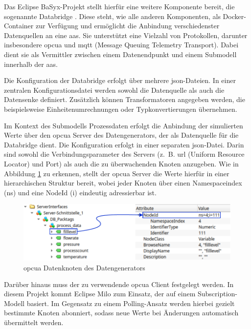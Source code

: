 Das Eclipse BaSyx-Projekt stellt hierfür eine weitere Komponente bereit, die sogenannte Databridge \cite{BaSyxDatabridge}.
Diese steht, wie alle anderen Komponenten, als Docker-Container zur Verfügung und ermöglicht die Anbindung verschiedenster Datenquellen an eine \acs{aas}.
Sie unterstützt eine Vielzahl von Protokollen, darunter insbesondere \acs{opcua} und \acs{mqtt} (Message Queuing Telemetry Transport).
Dabei dient sie als Vermittler zwischen einem Datenendpunkt und einem Submodell innerhalb der \acs{aas}.

Die Konfiguration der Databridge erfolgt über mehrere \acs{json}-Dateien.
In einer zentralen Konfigurationsdatei werden sowohl die Datenquelle als auch die Datensenke definiert.
Zusätzlich können Transformatoren angegeben werden, die beispielsweise Einheitenumrechnungen oder Typkonvertierungen übernehmen.

Im Kontext des Submodells Prozessdaten erfolgt die Anbindung der simulierten Werte über den \acs{opcua} Server des Datengenerators, der als Datenquelle für die Databridge dient.
Die Konfiguration erfolgt in einer separaten \acs{json}-Datei.
Darin sind sowohl die Verbindungsparameter des Servers (z.~B. \acs{url} (Uniform Resource Locator) und Port) als auch die zu überwachenden Knoten anzugeben.
Wie in Abbildung \ref{fig:OPCUADatenStruktur} zu erkennen, stellt der \acs{opcua} Server die Werte hierfür in einer hierarchischen Struktur bereit, wobei jeder Knoten über einen Namespaceindex (ns) und eine NodeId (i) eindeutig adressierbar ist.

\newpage
\begin{figure}[htbp]
    \centering
    \includegraphics{Bilder/OPCUA/OPCUADaten.pdf}
    \caption[\acs{opcua} Datenknoten des Datengenerators]{\acs{opcua} Datenknoten des Datengenerators}
    \label{fig:OPCUADatenStruktur}
\end{figure}

Darüber hinaus muss der zu verwendende \acs{opcua} Client festgelegt werden.
In diesem Projekt kommt Eclipse Milo zum Einsatz, der auf einem Subscription-Modell basiert.
Im Gegensatz zu einem Polling-Ansatz werden hierbei gezielt bestimmte Knoten abonniert, sodass neue Werte bei Änderungen automatisch übermittelt werden.

